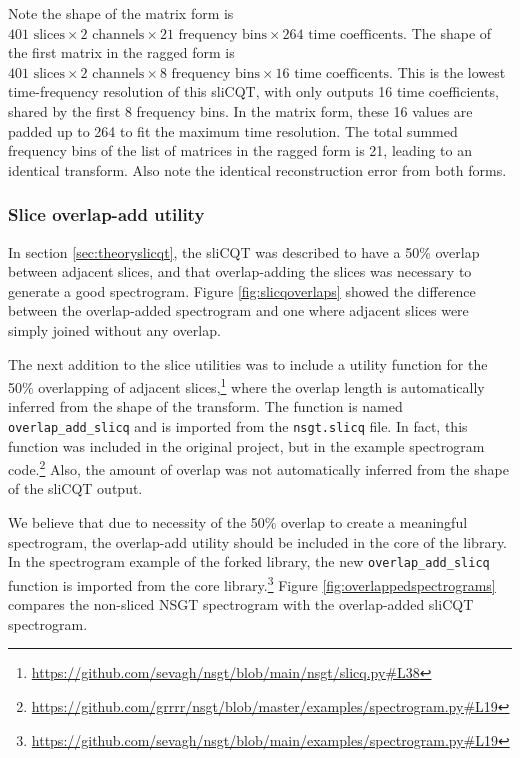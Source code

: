 \documentclass[report.tex]{subfiles}
\begin{document}
Note the shape of the matrix form is $401 \text{ slices} \times 2 \text{ channels} \times 21 \text{ frequency bins} \times 264 \text{ time coefficents}$. The shape of the first matrix in the ragged form is $401 \text{ slices} \times 2 \text{ channels} \times 8 \text{ frequency bins} \times 16 \text{ time coefficents}$. This is the lowest time-frequency resolution of this sliCQT, with only outputs 16 time coefficients, shared by the first 8 frequency bins. In the matrix form, these 16 values are padded up to 264 to fit the maximum time resolution. The total summed frequency bins of the list of matrices in the ragged form is 21, leading to an identical transform. Also note the identical reconstruction error from both forms.

\subsubsection{Slice overlap-add utility}
\label{sec:slicqola}

In section \ref{sec:theoryslicqt}, the sliCQT was described to have a 50\% overlap between adjacent slices, and that overlap-adding the slices was necessary to generate a good spectrogram. Figure \ref{fig:slicqoverlaps} showed the difference between the overlap-added spectrogram and one where adjacent slices were simply joined without any overlap.

The next addition to the slice utilities was to include a utility function for the 50\% overlapping of adjacent slices,\footnote{\url{https://github.com/sevagh/nsgt/blob/main/nsgt/slicq.py\#L38}} where the overlap length is automatically inferred from the shape of the transform. The function is named \Verb#overlap_add_slicq# and is imported from the \Verb#nsgt.slicq# file. In fact, this function was included in the original project, but in the example spectrogram code.\footnote{\url{https://github.com/grrrr/nsgt/blob/master/examples/spectrogram.py\#L19}} Also, the amount of overlap was not automatically inferred from the shape of the sliCQT output.

We believe that due to necessity of the 50\% overlap to create a meaningful spectrogram, the overlap-add utility should be included in the core of the library. In the spectrogram example of the forked library, the new \Verb#overlap_add_slicq# function is imported from the core library.\footnote{\url{https://github.com/sevagh/nsgt/blob/main/examples/spectrogram.py\#L19}} Figure \ref{fig:overlappedspectrograms} compares the non-sliced NSGT spectrogram with the overlap-added sliCQT spectrogram.
\end{document}
